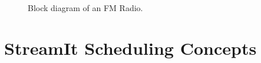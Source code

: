 \documentclass{sig-alt-full}
\begin{document}
\begin{figure}[t]
\begin{center}
\hspace{0.1in} 
\vspace{-24pt} \caption{\protect\small Block diagram of an FM
Radio. \protect\label{fig:radio-ascoded}}
\vspace{-18pt}
\end{center}
\end{figure}



\section{StreamIt Scheduling Concepts}
\label{chpt:sched-basic}
\end{document}
